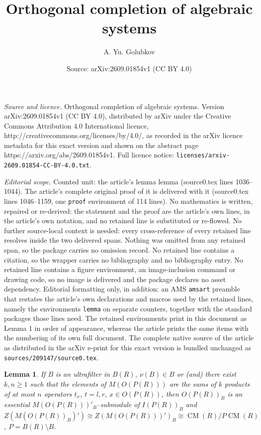 \documentclass[10pt,a4paper]{amsart}
\title{Orthogonal completion of algebraic systems}
\author{A. Yu. Golubkov}
\date{Source: arXiv:2609.01854v1 (CC BY 4.0)}
\newtheorem{lemma}{Lemma}
\DeclareMathOperator{\CM}{CM}
\begin{document}
\maketitle

\noindent\emph{Source and licence.} Orthogonal completion of algebraic systems. Version arXiv:2609.01854v1 (CC BY 4.0), distributed by arXiv under the Creative Commons Attribution 4.0 International licence, http://creativecommons.org/licenses/by/4.0/, as recorded in the arXiv licence metadata for this exact version and shown on the abstract page https://arxiv.org/abs/2609.01854v1. Full licence notice: \texttt{licenses/arxiv-2609.01854-CC-BY-4.0.txt}.\par\smallskip

\noindent\textit{Editorial scope.} Counted unit: the article's lemma lemma (source0.tex lines 1036--1044). The article's complete original proof of it is delivered with it (source0.tex lines 1046--1159, one \texttt{proof} environment of 114 lines). No mathematics is written, repaired or re-derived: the statement and the proof are the article's own lines, in the article's own notation, and no retained line is substituted or re-flowed.  No further source-local context is needed: every cross-reference of every retained line resolves inside the two delivered spans.  Nothing was omitted from any retained span, so the package carries no omission record.  No retained line contains a citation, so the wrapper carries no bibliography and no bibliography entry.  No retained line contains a figure environment, an image-inclusion command or drawing code, so no image is delivered and the package declares no asset dependency.  Editorial formatting only, in addition: an AMS \texttt{amsart} preamble that restates the article's own declarations and macros used by the retained lines, namely the environments \texttt{lemma} on separate counters, together with the standard packages those lines need.  The retained environments print in this document as Lemma 1 in order of appearance, whereas the article prints the same items with the numbering of its own full document.  The complete native source of the article as distributed in the arXiv e-print for this exact version is bundled unchanged as \texttt{sources/209147/source0.tex}.
\begin{lemma}
If $B$ is an ultrafilter in $B(R)$, ${\nu(B)\in B}$ or (and) there exist 
${k, n\geq 1}$ such that the elements of $M(O(P(R)))$ are the sums of $k$ 
products of at most $n$ operators $t_x$, 
${t=l, r}$, ${x\in O(P(R))}$, then $O(P(R))_B$ is an essential 
$M(O(P(R)))'_B$--submodule of $I(P(R))_B$ and 
${Z(M(O(P(R))_B)')\cong Z(M(O(P(R)))')_B\cong \CM(R)/P \CM(R)}$, 
${P=B(R)\setminus B}$.
\end{lemma}
\end{document}
